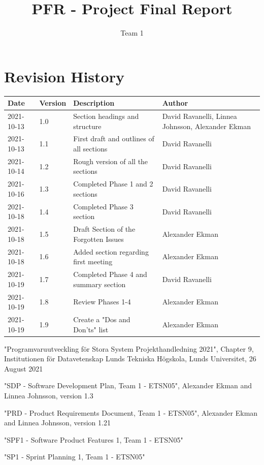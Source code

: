 \documentclass{article}
\title{PFR - Project Final Report}
\author{Team 1}
\begin{document}
\date{}
\maketitle
\thispagestyle{fancy}
\newpage

\section*{Revision History}
\begin{table}[h]
    \centering
    \begin{tabular}{|l|l|p{55mm}|p{35mm}|}
    \hline
    Date & Version & Description & Author \\ 
    \hline\hline 
    2021-10-13 & 1.0 & Section headings and structure & David Ravanelli, Linnea Johnsson, Alexander Ekman  \\
    \hline
    2021-10-13 & 1.1 & First draft and outlines of all sections & David Ravanelli  \\
    \hline
    2021-10-14 & 1.2 & Rough version of all the sections & David Ravanelli \\
    \hline
    2021-10-16 & 1.3 & Completed Phase 1 and 2 sections & David Ravanelli \\
    \hline
    2021-10-18 & 1.4 & Completed Phase 3 section & David Ravanelli \\
    \hline
    2021-10-18 & 1.5 & Draft Section of the Forgotten Issues & Alexander Ekman \\
    \hline
    2021-10-18 & 1.6 & Added section regarding first meeting & Alexander Ekman \\
    \hline
    2021-10-19 & 1.7 & Completed Phase 4 and summary section & David Ravanelli \\
    \hline
    2021-10-19 & 1.8 & Review Phases 1-4 & Alexander Ekman \\
    \hline
    2021-10-19 & 1.9 & Create a "Dos and Don'ts" list & Alexander Ekman \\
    \hline
    \end{tabular}
    \label{tab:history}
\end{table}
\newpage

\begin{thebibliography}{widest entry}

     "Programvaruutveckling för Stora System Projekthandledning 2021", Chapter 9, Institutionen för Datavetenskap Lunds Tekniska Högskola, Lunds Universitet, 26 August 2021
    
     "SDP - Software Development Plan, Team 1 - ETSN05", Alexander Ekman and Linnea Johnsson, version 1.3
    
     "PRD - Product Requirements Document, Team 1 - ETSN05", Alexander Ekman and Linnea Johnsson, version 1.21
    
     "SPF1 - Software Product Features 1, Team 1 - ETSN05"
    
     "SP1 - Sprint Planning 1, Team 1 - ETSN05"
    
\end{thebibliography}
\newpage
\end{document}
